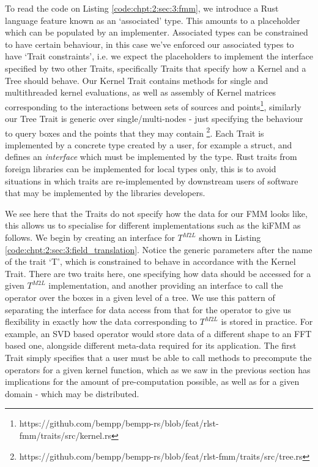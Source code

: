 To read the code on Listing \ref{code:chpt:2:sec:3:fmm}, we introduce a Rust language feature known as an `associated' type. This amounts to a placeholder which can be populated by an implementer. Associated types can be constrained to have certain behaviour, in this case we've enforced our associated types to have `Trait constraints', i.e. we expect the placeholders to implement the interface specified by two other Traits, specifically Traits that specify how a Kernel and a Tree should behave. Our Kernel Trait contains methods for single and multithreaded kernel evaluations, as well as assembly of Kernel matrices corresponding to the interactions between sets of sources and points\footnote{https://github.com/bempp/bempp-rs/blob/feat/rlst-fmm/traits/src/kernel.rs}, similarly our Tree Trait is generic over single/multi-nodes - just specifying the behaviour to query boxes and the points that they may contain \footnote{https://github.com/bempp/bempp-rs/blob/feat/rlst-fmm/traits/src/tree.rs}. Each Trait is implemented by a concrete type created by a user, for example a struct, and defines an \textit{interface} which must be implemented by the type. Rust traits from foreign libraries can be implemented for local types only, this is to avoid situations in which traits are re-implemented by downstream users of software that may be implemented by the libraries developers.

We see here that the Traits do not specify how the data for our FMM looks like, this allows us to specialise for different implementations such as the kiFMM as follows. We begin by creating an interface for $T^{M2L}$ shown in Listing \ref{code:chpt:2:sec:3:field_translation}. Notice the generic parameters after the name of the trait `T', which is constrained to behave in accordance with the Kernel Trait. There are two traits here, one specifying how data should be accessed for a given $T^{M2L}$ implementation, and another providing an interface to call the operator over the boxes in a given level of a tree. We use this pattern of separating the interface for data access from that for the operator to give us flexibility in exactly how the data corresponding to $T^{M2L}$ is stored in practice. For example, an SVD based operator would store data of a different shape to an FFT based one, alongside different meta-data required for its application. The first Trait simply specifies that a user must be able to call methods to precompute the operators for a given kernel function, which as we saw in the previous section has implications for the amount of pre-computation possible, as well as for a given domain - which may be distributed.

